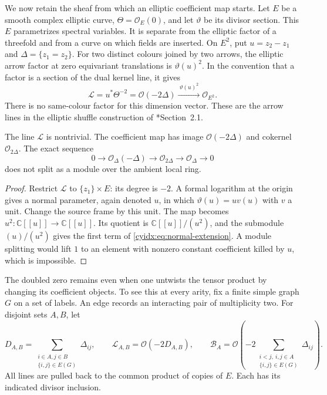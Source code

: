 We now retain the sheaf from which an elliptic coefficient
map starts. Let \(E\) be a smooth complex elliptic curve,
\(\Theta=\mathcal O_E(0)\), and let \(\vartheta\) be its
divisor section. This \(E\) parametrizes spectral variables.
It is separate from the elliptic factor of a threefold and
from a curve on which fields are inserted.
On \(E^2\), put \(u=z_2-z_1\) and
\(\Delta=\{z_1=z_2\}\).
For two distinct colours joined by two arrows, the elliptic
arrow factor at zero equivariant translations is
\(\vartheta(u)^2\). In the convention that a factor is a
section of the dual kernel line, it gives
\begin{equation}\label{cyidx:eq:pair}
 \mathcal L=u^*\Theta^{-2}=\mathcal O(-2\Delta)
       \xrightarrow{\ \vartheta(u)^2\ }\mathcal O_{E^2}.
\end{equation}
There is no same-colour factor for this dimension vector.
These are the arrow lines in the elliptic shuffle
construction of \cite{YangZhaoElliptic}*{Section~2.1}.

\begin{proposition}\label{cyidx:prop:normal-jet}
The line \(\mathcal L\) is nontrivial. The coefficient
map has image \(\mathcal O(-2\Delta)\) and cokernel
\(\mathcal O_{2\Delta}\). The exact sequence
\begin{equation}\label{cyidx:eq:normal-extension}
 0\longrightarrow\mathcal O_\Delta(-\Delta)
 \longrightarrow\mathcal O_{2\Delta}
 \longrightarrow\mathcal O_\Delta\longrightarrow0
\end{equation}
does not split as a module over the ambient local ring.
\end{proposition}
\begin{proof}
Restrict \(\mathcal L\) to \(\{z_1\}\times E\):
its degree is \(-2\). A formal logarithm at the origin
gives a normal parameter, again denoted \(u\), in which
\(\vartheta(u)=u v(u)\) with \(v\) a unit. Change
the source frame by this unit. The map becomes
\(u^2:\mathbb C[[u]]\to\mathbb C[[u]]\).
Its quotient is \(\mathbb C[[u]]/(u^2)\), and the
submodule \((u)/(u^2)\) gives the first term of
\eqref{cyidx:eq:normal-extension}. A module splitting
would lift \(1\) to an element with nonzero constant
coefficient killed by \(u\), which is impossible.
\end{proof}

The doubled zero remains even when one untwists the
tensor product by changing its coefficient objects.
To see this at every arity, fix a finite simple graph
\(G\) on a set of labels. An edge records an interacting
pair of multiplicity two. For disjoint sets \(A,B\), let
\[
 D_{A,B}=\sum_{\substack{i\in A,j\in B\\\{i,j\}\in E(G)}}
                  \Delta_{ij},\qquad
 \mathcal L_{A,B}=\mathcal O(-2D_{A,B}),
 \qquad
 \mathcal B_A=\mathcal O\left(-2\sum_{
       \substack{i<j,\ i,j\in A\\\{i,j\}\in E(G)}}\Delta_{ij}\right).
\]
All lines are pulled back to the common product of copies
of \(E\). Each has its indicated divisor inclusion.

